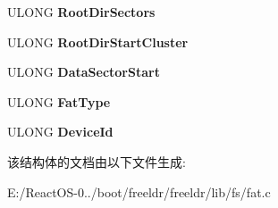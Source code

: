 \begin{DoxyCompactItemize}
\mbox{\label{struct___f_a_t___v_o_l_u_m_e___i_n_f_o_a19482cc85f0d555cda2f34ddd2c7b73f}} 
U\+L\+O\+NG {\bfseries Root\+Dir\+Sectors}
\item 
\mbox{\label{struct___f_a_t___v_o_l_u_m_e___i_n_f_o_ae4f79045888bc3471daade85e3f43fa8}} 
U\+L\+O\+NG {\bfseries Root\+Dir\+Start\+Cluster}
\item 
\mbox{\label{struct___f_a_t___v_o_l_u_m_e___i_n_f_o_a5ba1efa09261744b44eaf4dbc0864bdc}} 
U\+L\+O\+NG {\bfseries Data\+Sector\+Start}
\item 
\mbox{\label{struct___f_a_t___v_o_l_u_m_e___i_n_f_o_affee98166ff73481ec3a388f0dcefd60}} 
U\+L\+O\+NG {\bfseries Fat\+Type}
\item 
\mbox{\label{struct___f_a_t___v_o_l_u_m_e___i_n_f_o_abd79ac661586d7748e7c3ecc5870757c}} 
U\+L\+O\+NG {\bfseries Device\+Id}
\end{DoxyCompactItemize}


该结构体的文档由以下文件生成\+:\begin{DoxyCompactItemize}
\item 
E\+:/\+React\+O\+S-\/0../boot/freeldr/freeldr/lib/fs/fat.\+c\end{DoxyCompactItemize}
